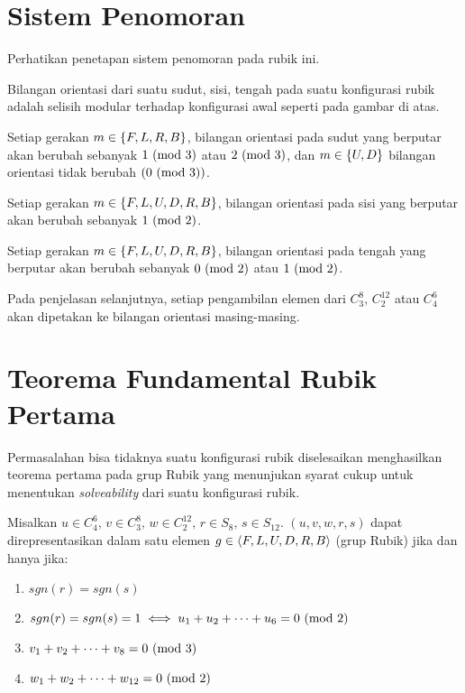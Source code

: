 \documentclass{article}
\begin{document}
\section{Sistem Penomoran}
Perhatikan penetapan sistem penomoran pada rubik ini.

Bilangan orientasi dari suatu sudut, sisi, tengah pada suatu konfigurasi rubik adalah selisih 
modular terhadap konfigurasi awal seperti pada gambar di atas.

\begin{lemma}
    Setiap gerakan $m \in \{F,L,R,B\}$, bilangan orientasi pada sudut yang berputar akan 
    berubah sebanyak $1\ (\mathrm{mod}\ 3)$ atau $2\ (\mathrm{mod}\ 3)$, dan $m\in \{U,D\}$ bilangan orientasi tidak berubah $(0\ (\mathrm{mod}\ 3))$.
\end{lemma}

\begin{lemma}
    Setiap gerakan $m \in \{F,L,U,D,R,B\}$, bilangan orientasi pada sisi yang berputar akan 
    berubah sebanyak $1\ (\mathrm{mod}\ 2)$.
\end{lemma}

\begin{lemma}
    Setiap gerakan $m \in \{F,L,U,D,R,B\}$, bilangan orientasi pada tengah yang berputar akan 
    berubah sebanyak $0\ (\mathrm{mod}\ 2)$ atau $1\ (\mathrm{mod}\ 2)$.
\end{lemma}

Pada penjelasan selanjutnya, setiap pengambilan elemen dari $C_3^8,\,C_2^{12}$ atau $C_4^6$ akan dipetakan
ke bilangan orientasi masing-masing.

\section{Teorema Fundamental Rubik Pertama}
Permasalahan bisa tidaknya suatu konfigurasi rubik diselesaikan menghasilkan teorema 
pertama pada grup Rubik yang menunjukan syarat cukup untuk menentukan \textit{solveability} dari suatu konfigurasi rubik.
\begin{theorem}
    Misalkan $u \in C_4^6,\,v\in C_3^8,\,w\in C_2^{12},\,r\in S_8,\,s\in S_{12}$. $(u,v,w,r,s)$ dapat 
    direpresentasikan dalam satu elemen $g \in \langle F,L,U,D,R,B\rangle$ (grup Rubik) jika dan hanya jika:
    \begin{enumerate}
        \item $sgn(r)=sgn(s)$
        \item $sgn(r)=sgn(
            s) = 1 \iff u_1+u_2+\dots+u_6=0\ (\mathrm{mod}\ 2)$
        \item $v_1+v_2+\dots+v_8 = 0\ (\mathrm{mod}\ 3)$
        \item $w_1+w_2+\dots+w_{12} = 0\ (\mathrm{mod}\ 2)$
    \end{enumerate}
\end{theorem}
\end{document}
